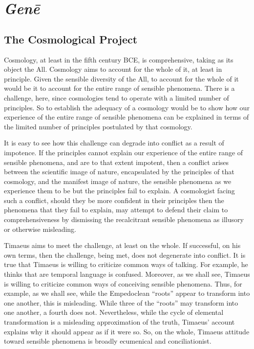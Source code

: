 
\chapter{\emph{Genē}} %
\label{cha:gene}

\section{The Cosmological Project} %
\label{sec:the_cosmological_project}

Cosmology, at least in the fifth century BCE, is comprehensive, taking as its object the All. Cosmology aims to account for the whole of it, at least in principle. Given the sensible diversity of the All, to account for the whole of it would be it to account for the entire range of sensible phenomena. There is a challenge, here, since cosmologies tend to operate with a limited number of principles. So to establish the adequacy of a cosmology would be to show how our experience of the entire range of sensible phenomena can be explained in terms of the limited number of principles postulated by that cosmology.

It is easy to see how this challenge can degrade into conflict as a result of impotence. If the principles cannot explain our experience of the entire range of sensible phenomena, and are to that extent impotent, then a conflict arises between the scientific image of nature, encapsulated by the principles of that cosmology, and the manifest image of nature, the sensible phenomena as we experience them to be but the principles fail to explain. A cosmologist facing such a conflict, should they be more confident in their principles then the phenomena that they fail to explain, may attempt to defend their claim to comprehensiveness by dismissing the recalcitrant sensible phenomena as illusory or otherwise misleading.

Timaeus aims to meet the challenge, at least on the whole. If successful, on his own terms, then the challenge, being met, does not degenerate into conflict. It is true that Timaeus is willing to criticize common ways of talking. For example, he thinks that are temporal language is confused. Moreover, as we shall see, Timaeus is willing to criticize common ways of conceiving sensible phenomena. Thus, for example, as we shall see, while the Empedoclean ``roots'' appear to transform into one another, this is misleading. While three of the ``roots'' may transform into one another, a fourth does not. Nevertheless, while the cycle of elemental transformation is a misleading approximation of the truth, Timaeus' account explains why it should appear as if it were so. So, on the whole, Timaeus attitude toward sensible phenomena is broadly ecumenical and conciliationist. 

